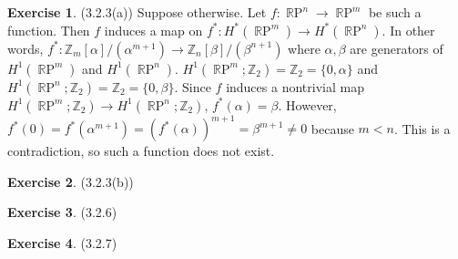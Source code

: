 \documentclass[12pt, psamsfonts]{amsart}
\theoremstyle{definition}
\newtheorem*{exer}{Exercise}
\theoremstyle{remark}
\DeclareMathOperator{\RP}{\mathbb{R}P}
\numberwithin{equation}{section}
\begin{document}
\begin{exer}{(3.2.3(a))}
  Suppose otherwise.
  Let $f: \RP^n \rightarrow \RP^m$ be such a function.
  Then $f$ induces a map on $f^{\ast}: H^{\ast}(\RP^m) \rightarrow H^{\ast}(\RP^n)$.
  In other words, $f^{\ast}: \mathbb{Z}_m[\alpha]/(\alpha^{m + 1}) \rightarrow \mathbb{Z}_n[\beta]/(\beta^{n + 1})$ where $\alpha, \beta$ are generators of $H^1(\RP^m)$ and $H^1(\RP^n)$.
  $H^1(\RP^m; \mathbb{Z}_2) = \mathbb{Z}_2 = \{ 0, \alpha \}$ and $H^1(\RP^n; \mathbb{Z}_2) = \mathbb{Z}_2 = \{ 0, \beta \}$.
  Since $f$ induces a nontrivial map $H^1(\RP^m; \mathbb{Z}_2) \rightarrow H^1(\RP^n; \mathbb{Z}_2)$, $f^{\ast}(\alpha) = \beta$.
  However, $f^{\ast}(0) = f^{\ast}(\alpha^{m + 1}) = (f^{\ast}(\alpha))^{m + 1} = \beta^{m + 1} \ne 0$ because $m < n$.
  This is a contradiction, so such a function does not exist.

\end{exer}

\begin{exer}{(3.2.3(b))}
\end{exer}

\begin{exer}{(3.2.6)}
\end{exer}

\begin{exer}{(3.2.7)}
\end{exer}
\end{document}
